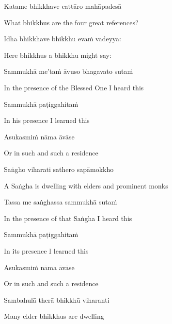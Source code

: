 Katame bhikkhave cattāro mahāpadesā

\begin{english}
  What bhikkhus are the four great references?
\end{english}

Idha bhikkhave bhikkhu evaṁ vadeyya:

\begin{english}
  Here bhikkhus a bhikkhu might say:
\end{english}

Sammukhā me'taṁ āvuso bhagavato sutaṁ

\begin{english}
  In the presence of the Blessed One I heard this
\end{english}

Sammukhā paṭiggahitaṁ

\begin{english}
  In his presence I learned this
\end{english}

Asukasmiṁ nāma āvāse

\begin{english}
  Or in such and such a residence
\end{english}

Saṅgho viharati sathero sapāmokkho

\begin{english}
  A Saṅgha is dwelling with elders and prominent monks
\end{english}

Tassa me saṅghassa sammukhā sutaṁ

\begin{english}
  In the presence of that Saṅgha I heard this
\end{english}

Sammukhā paṭiggahitaṁ

\begin{english}
  In its presence I learned this
\end{english}

Asukasmiṁ nāma āvāse

\begin{english}
  Or in such and such a residence
\end{english}

Sambahulā therā bhikkhū viharanti

\begin{english}
  Many elder bhikkhus are dwelling
\end{english}


